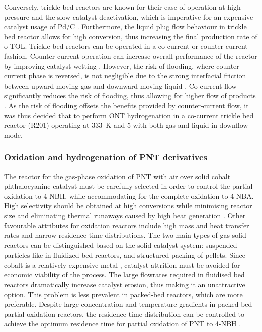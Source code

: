 Conversely, trickle bed reactors are known for their ease of operation at high pressure and the slow catalyst deactivation, which is imperative for an expensive catalyst usage of Pd/C \cite{vemala_hydrodynamic_nodate}. Furthermore, the liquid plug flow behaviour in trickle bed reactor allows for high conversion, thus increasing the final production rate of o-TOL. Trickle bed reactors can be operated in a co-current or counter-current fashion. Counter-current operation can increase overall performance of the reactor by improving catalyst wetting \cite{kundu_novel_2003}. However, the risk of flooding, where counter-current phase is reversed, is not negligible due to the strong interfacial friction between upward moving gas and downward moving liquid \cite{breijer_prevention_2008}. Co-current flow significantly reduces the risk of flooding, thus allowing for higher flow of products \cite{vemala_hydrodynamic_nodate}. As the risk of flooding offsets the benefits provided by counter-current flow, it was thus decided that to perform ONT hydrogenation in a co-current trickle bed reactor (R201) operating at \SI{333}{\K} and \SI{5}{\atm} with both gas and liquid in downflow mode. 


\subsubsection{Oxidation and hydrogenation of PNT derivatives} \label{sec:synthesis-R3-R4}

The reactor for the gas-phase oxidation of PNT with air over solid cobalt phthalocyanine catalyst must be carefully selected in order to control the partial oxidation to 4-NBH, while accommodating for the complete oxidation to 4-NBA. High selectivity should be obtained at high conversions while minimising reactor size and eliminating thermal runaways caused by high heat generation \cite{schmidt_catalytic_1994}. Other favourable attributes for oxidation reactors include high  mass and heat transfer rates and narrow residence time distributions. The two main types of gas-solid reactors can be distinguished based on the solid catalyst system: suspended particles like in fluidized bed reactors, and structured packing of pellets. Since cobalt is a relatively expensive metal \cite{saib_fundamental_2014}, catalyst attrition must be avoided for economic viability of the process. The large flowrates required in fluidised bed reactors dramatically increase catalyst erosion, thus making it an unattractive option. This problem is less prevalent in packed-bed reactors, which are more preferable. Despite large concentration and temperature gradients in packed bed partial oxidation reactors, the residence time distribution can be controlled to achieve the optimum residence time for partial oxidation of PNT to 4-NBH \cite{schmidt_catalytic_1994}.

